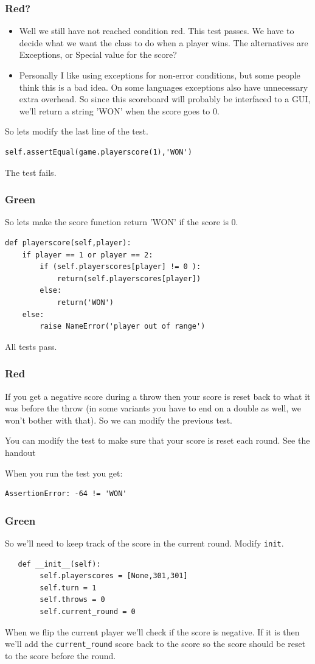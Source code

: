 \documentclass{beamer}
\begin{document}
\begin{frame}
\frametitle{Red?}
\begin{itemize}
\item Well we still have not reached condition red. This test passes. We
have to decide what we want the class to do when a player wins. 
The alternatives are  Exceptions, or  Special value for the score?
\item Personally I like using exceptions for non-error conditions, but some
people think this is a bad idea. On some languages exceptions also
have unnecessary extra overhead. So since this scoreboard will
probably be interfaced to a GUI, we'll return a string 'WON' when the
score goes to 0.
\end{itemize}
\end{frame}
\begin{frame}[fragile]
So lets modify the last line of the test.
\begin{lstlisting}
self.assertEqual(game.playerscore(1),'WON')  
\end{lstlisting}

The test fails. 
\end{frame}
\begin{frame}[fragile]
\frametitle{Green}
So lets make the score function return 'WON' if the score is 0.
\begin{lstlisting}
def playerscore(self,player):
    if player == 1 or player == 2:
        if (self.playerscores[player] != 0 ): 
            return(self.playerscores[player])
        else:
            return('WON')
    else:
        raise NameError('player out of range')
 \end{lstlisting}
All tests pass.
  
\end{frame}
\begin{frame}[fragile]
\frametitle{Red}
If you get a negative score during a throw then your score is reset
back to what it was before the throw (in some variants you have to end
on a double as well, we won't bother with that).  So we can modify the
previous test.

You can modify the test to make sure that your score is reset each
round. See the handout

When you run the test you get:
\begin{verbatim}
AssertionError: -64 != 'WON'
\end{verbatim}
  
\end{frame}
\begin{frame}[fragile]
\frametitle{Green}
So we'll need to keep track of the score in the current round.
Modify {\tt init}.
\begin{lstlisting}
   def __init__(self):
        self.playerscores = [None,301,301]
        self.turn = 1
        self.throws = 0
        self.current_round = 0
\end{lstlisting}
When we flip the current player we'll check if the score is negative. If it
is then we'll add the {\tt current\_round} score back to the score so the
score should be reset to the score before the round.
  
\end{frame}
\end{document}
